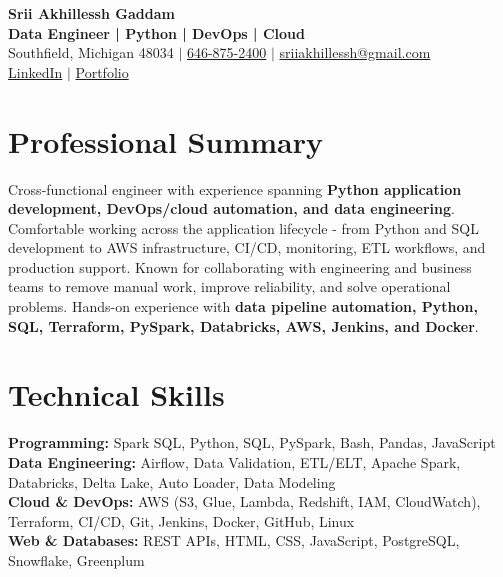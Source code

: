 \documentclass[letterpaper,10pt]{article}
\begin{document}
\fontsize{9.35pt}{10.45pt}\selectfont

\begin{center}
    {\LARGE \textbf{Srii Akhillessh Gaddam}} \\[-1pt]
    \textbf{Data Engineer | Python | DevOps | Cloud} \\[2pt]
    Southfield, Michigan 48034 $|$
    \href{tel:6468752400}{646-875-2400} $|$
    \href{mailto:sriiakhillessh@gmail.com}{sriiakhillessh@gmail.com} \\[1pt]
    \href{https://www.linkedin.com/in/srii-akhiilessh-gaddam-b48668191/}{LinkedIn} $|$
    \href{https://sriiakhillesshg.github.io/portfolio/}{Portfolio}
\end{center}
\vspace{-8pt}

\section{Professional Summary}
\small{Cross-functional engineer with experience spanning \textbf{Python application development, DevOps/cloud automation, and data engineering}. Comfortable working across the application lifecycle - from Python and SQL development to AWS infrastructure, CI/CD, monitoring, ETL workflows, and production support. Known for collaborating with engineering and business teams to remove manual work, improve reliability, and solve operational problems. Hands-on experience with \textbf{data pipeline automation, Python, SQL, Terraform, PySpark, Databricks, AWS, Jenkins, and Docker}.}

\section{Technical Skills}
\small{
\textbf{Programming:} Spark SQL, Python, SQL, PySpark, Bash, Pandas, JavaScript \\
\textbf{Data Engineering:} Airflow, Data Validation, ETL/ELT, Apache Spark, Databricks, Delta Lake, Auto Loader, Data Modeling \\
\textbf{Cloud \& DevOps:} AWS (S3, Glue, Lambda, Redshift, IAM, CloudWatch), Terraform, CI/CD, Git, Jenkins, Docker, GitHub, Linux \\
\textbf{Web \& Databases:} REST APIs, HTML, CSS, JavaScript, PostgreSQL, Snowflake, Greenplum
}

\end{document}

